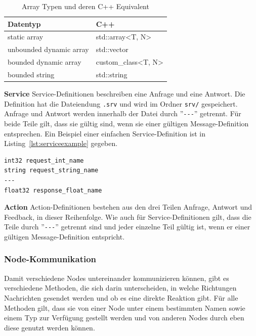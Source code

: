 \begin{table}[ht]
    \centering
    \caption{Array Typen und deren C++ Equivalent}
\begin{tabular}{|l|l|}
\hline
\textbf{Datentyp} & \textbf{C++}   \\ \hline
static array               & std::array<T, N>   \\ \hline
unbounded dynamic array    & std::vector        \\ \hline
bounded dynamic array      & custom\_class<T, N> \\ \hline
bounded string             & std::string        \\ \hline
\end{tabular}
    \label{tab:arraytypes}
\end{table}

\textbf{Service} Service-Definitionen beschreiben eine Anfrage und eine Antwort.
Die Definition hat die Dateiendung \verb|.srv| und wird im Ordner \verb|srv/| gespeichert.
Anfrage und Antwort werden innerhalb der Datei durch ''\verb|---|'' getrennt.
Für beide Teile gilt, dass sie gültig sind, wenn sie einer gültigen Message-Definition entsprechen.
Ein Beispiel einer einfachen Service-Definition ist in Listing~\ref{lst:serviceexample} gegeben.\\
\begin{minipage}{\linewidth}%
\begin{lstlisting}[caption={Beispiel einer Service-Definition}, label={lst:serviceexample}]
int32 request_int_name
string request_string_name
---
float32 response_float_name
\end{lstlisting}
\end{minipage}

\textbf{Action} Action-Definitionen bestehen aus den drei Teilen Anfrage, Antwort und Feedback, in dieser Reihenfolge.
Wie auch für Service-Definitionen gilt, dass die Teile durch ''\verb|---|'' getrennt sind und jeder einzelne Teil gültig ist, wenn er einer gültigen Message-Definition entspricht.

\subsubsection{Node-Kommunikation}{\label{rosnodecomm}}
Damit verschiedene Nodes untereinander kommunizieren können, gibt es verschiedene Methoden, die sich darin unterscheiden, in welche Richtungen Nachrichten gesendet werden und ob es eine direkte Reaktion gibt.
Für alle Methoden gilt, dass sie von einer Node unter einem bestimmten Namen sowie einem Typ zur Verfügung gestellt werden und von anderen Nodes durch eben diese genutzt werden können.\\

